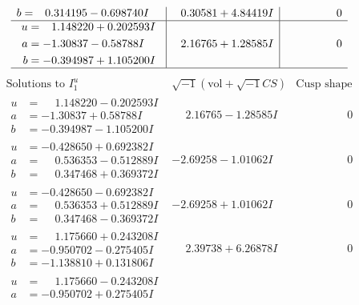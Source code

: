 \documentclass[1p]{elsarticle_modified}
\theoremstyle{definition}
\newcommand{\I}{\sqrt{-1}}
\begin{document}
$$\begin{array}{c|c|c}
\begin{aligned}
b &= \phantom{-}0.314195 - 0.698740 I\end{aligned}
 & \phantom{-}0.30581 + 4.84419 I & \phantom{-0.000000 } 0 \\ \hline\begin{aligned}
u &= \phantom{-}1.148220 + 0.202593 I \\
a &= -1.30837 - 0.58788 I \\
b &= -0.394987 + 1.105200 I\end{aligned}
 & \phantom{-}2.16765 + 1.28585 I & \phantom{-0.000000 } 0\\
 \hline 
 \end{array}$$\newpage$$\begin{array}{c|c|c}  
\text{Solutions to }I^u_{1}& \I (\text{vol} + \sqrt{-1}CS) & \text{Cusp shape}\\
 \hline 
\begin{aligned}
u &= \phantom{-}1.148220 - 0.202593 I \\
a &= -1.30837 + 0.58788 I \\
b &= -0.394987 - 1.105200 I\end{aligned}
 & \phantom{-}2.16765 - 1.28585 I & \phantom{-0.000000 } 0 \\ \hline\begin{aligned}
u &= -0.428650 + 0.692382 I \\
a &= \phantom{-}0.536353 - 0.512889 I \\
b &= \phantom{-}0.347468 + 0.369372 I\end{aligned}
 & -2.69258 - 1.01062 I & \phantom{-0.000000 } 0 \\ \hline\begin{aligned}
u &= -0.428650 - 0.692382 I \\
a &= \phantom{-}0.536353 + 0.512889 I \\
b &= \phantom{-}0.347468 - 0.369372 I\end{aligned}
 & -2.69258 + 1.01062 I & \phantom{-0.000000 } 0 \\ \hline\begin{aligned}
u &= \phantom{-}1.175660 + 0.243208 I \\
a &= -0.950702 - 0.275405 I \\
b &= -1.138810 + 0.131806 I\end{aligned}
 & \phantom{-}2.39738 + 6.26878 I & \phantom{-0.000000 } 0 \\ \hline\begin{aligned}
u &= \phantom{-}1.175660 - 0.243208 I \\
a &= -0.950702 + 0.275405 I \\

\end{aligned}
\end{array}$$
\end{document}
